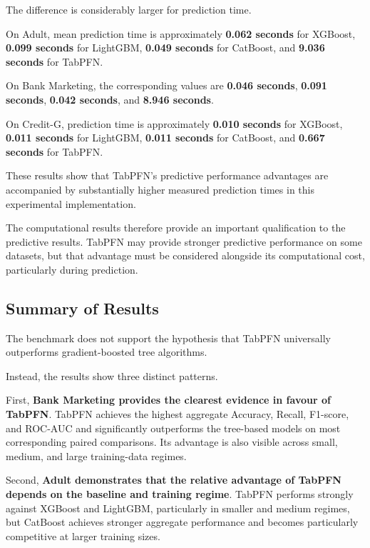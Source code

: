 The difference is considerably larger for prediction time.



On Adult, mean prediction time is approximately \textbf{0.062 seconds} for XGBoost, \textbf{0.099 seconds} for LightGBM, \textbf{0.049 seconds} for CatBoost, and \textbf{9.036 seconds} for TabPFN.



On Bank Marketing, the corresponding values are \textbf{0.046 seconds}, \textbf{0.091 seconds}, \textbf{0.042 seconds}, and \textbf{8.946 seconds}.



On Credit-G, prediction time is approximately \textbf{0.010 seconds} for XGBoost, \textbf{0.011 seconds} for LightGBM, \textbf{0.011 seconds} for CatBoost, and \textbf{0.667 seconds} for TabPFN.



These results show that TabPFN's predictive performance advantages are accompanied by substantially higher measured prediction times in this experimental implementation.



The computational results therefore provide an important qualification to the predictive results. TabPFN may provide stronger predictive performance on some datasets, but that advantage must be considered alongside its computational cost, particularly during prediction.



\subsection{Summary of Results}



The benchmark does not support the hypothesis that TabPFN universally outperforms gradient-boosted tree algorithms.



Instead, the results show three distinct patterns.



First, \textbf{Bank Marketing provides the clearest evidence in favour of TabPFN}. TabPFN achieves the highest aggregate Accuracy, Recall, F1-score, and ROC-AUC and significantly outperforms the tree-based models on most corresponding paired comparisons. Its advantage is also visible across small, medium, and large training-data regimes.



Second, \textbf{Adult demonstrates that the relative advantage of TabPFN depends on the baseline and training regime}. TabPFN performs strongly against XGBoost and LightGBM, particularly in smaller and medium regimes, but CatBoost achieves stronger aggregate performance and becomes particularly competitive at larger training sizes.



